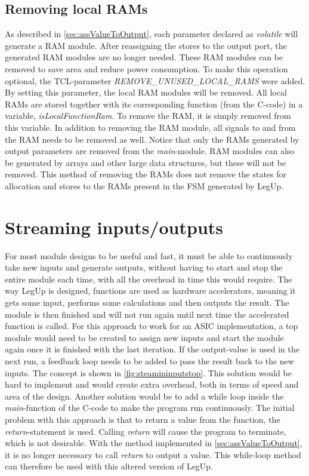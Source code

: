 \subsection{Removing local RAMs}
As described in \cref{sec:assValueToOutput}, each parameter declared as \textit{volatile} will generate a RAM module. After reassigning the stores to the output port, the generated RAM modules are no longer needed. These RAM modules can be removed to save area and reduce power consumption. To make this operation optional, the TCL-parameter \textit{REMOVE\_UNUSED\_LOCAL\_RAMS} were added. By setting this parameter, the local RAM modules will be removed. All local RAMs are stored together with its corresponding function (from the C-code) in a variable, \textit{isLocalFunctionRam}. To remove the RAM, it is simply removed from this variable. In addition to removing the RAM module, all signals to and from the RAM needs to be removed as well. Notice that only the RAMs generated by output parameters are removed from the \textit{main}-module. RAM modules can also be generated by arrays and other large data structures, but these will not be removed. This method of removing the RAMs does not remove the states for allocation and stores to the RAMs present in the FSM generated by LegUp. 

\section{\label{sec:streamingio}Streaming inputs/outputs}
For most module designs to be useful and fast, it must be able to continuously take new inputs and generate outputs, without having to start and stop the entire module each time, with all the overhead in time this would require. The way LegUp is designed, functions are used as hardware accelerators, meaning it gets some input, performs some calculations and then outputs the result. The module is then finished and will not run again until next time the accelerated function is called. For this approach to work for an ASIC implementation, a top module would need to be created to assign new inputs and start the module again once it is finished with the last iteration. If the output-value is used in the next run, a feedback loop needs to be added to pass the result back to the new inputs. The concept is shown in \cref{fig:steamininputstop}. This solution would be hard to implement and would create extra overhead, both in terms of speed and area of the design. Another solution would be to add a while loop inside the \textit{main}-function of the C-code to make the program run continuously. The initial problem with this approach is that to return a value from the function, the \textit{return}-statement is used. Calling \textit{return} will cause the program to terminate, which is not desirable. With the method implemented in \cref{sec:assValueToOutput}, it is no longer necessary to call \textit{return} to output a value. This while-loop method can therefore be used with this altered version of LegUp.


